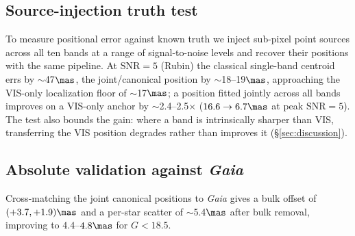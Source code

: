 \subsection{Source-injection truth test}
\label{sec:results:injection}

To measure positional error against known truth we inject sub-pixel point
sources across all ten bands at a range of signal-to-noise levels and recover
their positions with the same pipeline. At $\mathrm{SNR}=5$ (Rubin) the
classical single-band centroid errs by $\sim$47$\mas$, the joint/canonical
position by $\sim$18--19$\mas$, approaching the VIS-only localization floor of
$\sim$17$\mas$; a position fitted jointly across all bands improves on a
VIS-only anchor by $\sim$2.4--2.5$\times$ ($16.6\rightarrow6.7\mas$ at peak
$\mathrm{SNR}=5$). 
The test also bounds the gain: where a band is intrinsically sharper than VIS,
transferring the VIS position degrades rather than improves it
(\S\ref{sec:discussion}).

\subsection{Absolute validation against \textit{Gaia}}
\label{sec:results:gaia}

Cross-matching the joint canonical positions to \textit{Gaia} gives a bulk
offset of $(+3.7, +1.9)\mas$ and a per-star scatter of $\sim$5.4$\mas$ after
bulk removal, improving to $4.4$--$4.8\mas$ for $G<18.5$. 

